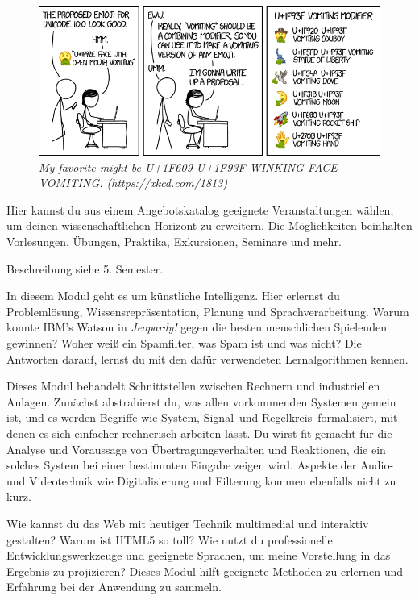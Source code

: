 \begin{figure}[b!]
\centering
\includegraphics[scale=.4]{img/xkcd/vomiting_emoji.png}
\caption*{{\small \textit{My favorite might be U+1F609 U+1F93F WINKING FACE VOMITING. (https://xkcd.com/1813)}}}
\end{figure}


Hier kannst du aus einem Angebotskatalog geeignete Veranstaltungen wählen, um deinen wissenschaftlichen Horizont zu erweitern.
Die Möglichkeiten beinhalten Vorlesungen, Übungen, Praktika, Exkursionen, Seminare und mehr.

Beschreibung siehe 5. Semester.

In diesem Modul geht es um künstliche Intelligenz.
Hier erlernst du Problemlösung, Wissensrepräsentation, Planung und Sprachverarbeitung.
Warum konnte IBM's Watson in \textit{Jeopardy!} gegen die besten menschlichen Spielenden gewinnen?
Woher weiß ein Spamfilter, was Spam ist und was nicht?
Die Antworten darauf, lernst du mit den dafür verwendeten Lernalgorithmen kennen.

Dieses Modul behandelt Schnittstellen zwischen Rechnern und industriellen Anlagen.
Zunächst abstrahierst du, was allen vorkommenden Systemen gemein ist, und es werden Begriffe wie \glqq System\grqq, \glqq Signal\grqq\ und \glqq Regelkreis\grqq\ formalisiert, mit denen es sich einfacher rechnerisch arbeiten lässt.
Du wirst fit gemacht für die Analyse und Voraussage von Übertragungsverhalten und Reaktionen, die ein solches System bei einer bestimmten Eingabe zeigen wird.
Aspekte der Audio- und Videotechnik wie Digitalisierung und Filterung kommen ebenfalls nicht zu kurz.

Wie kannst du das Web mit heutiger Technik multimedial und interaktiv gestalten? Warum ist HTML5 so toll?
Wie nutzt du professionelle Entwicklungswerkzeuge und geeignete Sprachen, um meine Vorstellung in das Ergebnis zu projizieren?
Dieses Modul hilft geeignete Methoden zu erlernen und Erfahrung bei der Anwendung zu sammeln.

